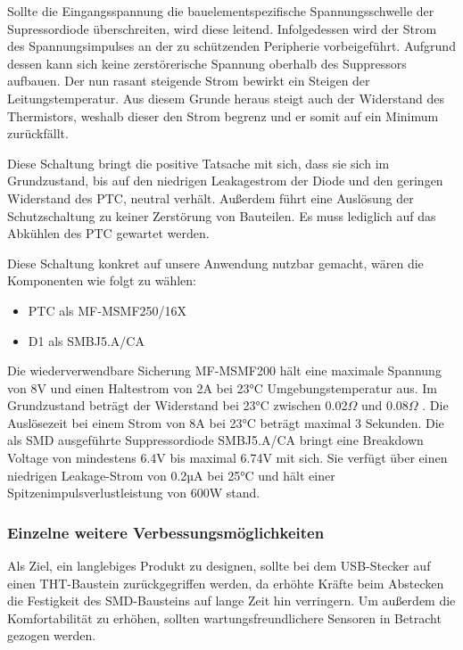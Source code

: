 Sollte die Eingangsspannung die bauelementspezifische Spannungsschwelle der Supressordiode überschreiten, wird diese leitend.
Infolgedessen wird der Strom des Spannungsimpulses an der zu schützenden Peripherie vorbeigeführt.
Aufgrund dessen kann sich keine zerstörerische Spannung oberhalb des Suppressors aufbauen.
Der nun rasant steigende Strom bewirkt ein Steigen der Leitungstemperatur.
Aus diesem Grunde heraus steigt auch der Widerstand des Thermistors, weshalb dieser den Strom begrenz und er somit auf ein Minimum zurückfällt.

Diese Schaltung bringt die positive Tatsache mit sich, dass sie sich im Grundzustand, bis auf den niedrigen Leakagestrom der Diode und den geringen Widerstand des PTC, neutral verhält.
Außerdem führt eine Auslösung der Schutzschaltung zu keiner Zerstörung von Bauteilen.
Es muss lediglich auf das Abkühlen des PTC gewartet werden.

Diese Schaltung konkret auf unsere Anwendung nutzbar gemacht, wären die Komponenten wie folgt zu wählen:
\begin{itemize}
    \item PTC als MF-MSMF250/16X
    \item D1 als SMBJ5.A/CA
\end{itemize}

Die wiederverwendbare Sicherung MF-MSMF200 hält eine maximale Spannung von 8V und einen Haltestrom von 2A bei 23°C Umgebungstemperatur aus.
Im Grundzustand beträgt der Widerstand bei 23°C zwischen 0.02$\Omega$ und 0.08$\Omega$ .
Die Auslösezeit bei einem Strom von 8A bei 23°C beträgt maximal 3 Sekunden.
\newpage
{}Die als SMD ausgeführte Suppressordiode SMBJ5.A/CA bringt eine Breakdown Voltage von mindestens 6.4V bis maximal 6.74V mit sich.
Sie verfügt über einen niedrigen Leakage-Strom von 0.2µA bei 25°C und hält einer Spitzenimpulsverlustleistung von 600W stand.

\subsubsection{Einzelne weitere Verbessungsmöglichkeiten}

Als Ziel, ein langlebiges Produkt zu designen, sollte bei dem USB-Stecker auf einen THT-Baustein zurückgegriffen werden,
da erhöhte Kräfte beim Abstecken die Festigkeit des SMD-Bausteins auf lange Zeit hin verringern.
Um außerdem die Komfortabilität zu erhöhen, sollten wartungsfreundlichere Sensoren in Betracht gezogen werden. \\

